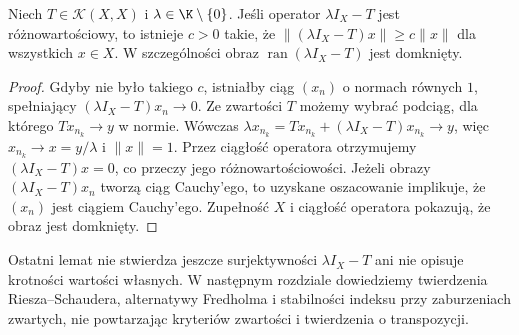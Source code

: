 \begin{lemat}
\label{lem:compact-eigenvalue29}
Niech $T\in\mathcal K(X,X)$ i $\lambda\in\K\setminus\{0\}$.
Jeśli operator $\lambda I_X-T$ jest różnowartościowy,
to istnieje $c>0$ takie, że
$\|(\lambda I_X-T)x\|\ge c\|x\|$ dla wszystkich $x\in X$.
W szczególności obraz $\operatorname{ran}(\lambda I_X-T)$
jest domknięty.
\end{lemat}
\begin{proof}
Gdyby nie było takiego $c$, istniałby ciąg $(x_n)$
o normach równych $1$, spełniający
$(\lambda I_X-T)x_n\to0$. Ze zwartości $T$ możemy
wybrać podciąg, dla którego $Tx_{n_k}\to y$ w normie.
Wówczas $\lambda x_{n_k}=Tx_{n_k}+
(\lambda I_X-T)x_{n_k}\to y$, więc $x_{n_k}\to x=y/\lambda$
i $\|x\|=1$. Przez ciągłość operatora otrzymujemy
$(\lambda I_X-T)x=0$, co przeczy jego różnowartościowości.
Jeżeli obrazy $(\lambda I_X-T)x_n$ tworzą ciąg Cauchy'ego,
to uzyskane oszacowanie implikuje, że $(x_n)$ jest
ciągiem Cauchy'ego. Zupełność $X$ i ciągłość operatora
pokazują, że obraz jest domknięty.
\end{proof}

\begin{uwaga}
\label{rem:fredholm-next29}
Ostatni lemat nie stwierdza jeszcze surjektywności
$\lambda I_X-T$ ani nie opisuje krotności wartości
własnych. W następnym rozdziale dowiedziemy twierdzenia
Riesza--Schaudera, alternatywy Fredholma i stabilności
indeksu przy zaburzeniach zwartych, nie powtarzając
kryteriów zwartości i twierdzenia o transpozycji.
\end{uwaga}
